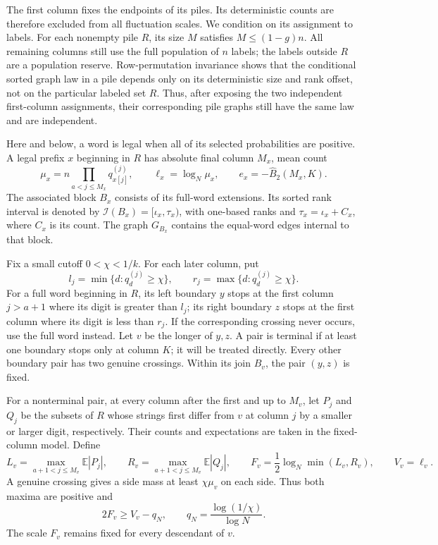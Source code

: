 \documentclass[11pt]{article}
\numberwithin{equation}{section}
\newcommand{\E}{\mathbb E}
\newcommand{\1}{\mathbf 1}
\begin{document}
The first column fixes the endpoints of its piles. Its deterministic
counts are therefore excluded from all fluctuation scales. We condition
on its assignment to labels. For each nonempty pile $R$, its size $M$
satisfies $M\le(1-g)n$. All remaining columns still use the full
population of $n$ labels; the labels outside $R$ are a population reserve.
Row-permutation invariance shows that the conditional sorted graph law
in a pile depends only on its deterministic size and rank offset, not
on the particular labeled set $R$. Thus, after exposing the two
independent first-column assignments, their corresponding pile graphs
still have the same law and are independent.

Here and below, a word is legal when all of its selected probabilities
are positive. A legal prefix $x$ beginning in $R$ has absolute final
column $M_x$, mean count
\[
 \mu_x=n\prod_{a<j\le M_x}q^{(j)}_{x[j]},\qquad
 \ell_x=\log_N\mu_x,\qquad e_x=-\widehat B_2(M_x,K).
\]
The associated block $B_x$ consists of its full-word extensions. Its
sorted rank interval is denoted by $\mathcal I(B_x)=[\iota_x,\tau_x)$,
with one-based ranks and $\tau_x=\iota_x+C_x$, where $C_x$ is its count.
The graph $G_{B_x}$ contains the equal-word edges internal to that block.

Fix a small cutoff $0<\chi<1/k$. For each later column, put
\[
 l_j=\min\{d:q^{(j)}_d\ge\chi\},\qquad
 r_j=\max\{d:q^{(j)}_d\ge\chi\}.
\]
For a full word beginning in $R$, its left boundary $y$ stops at the first
column $j>a+1$ where its digit is greater than $l_j$; its right boundary
$z$ stops at the first column where its digit is less than $r_j$.
If the corresponding crossing never occurs, use the full word instead.
Let $v$ be the longer of $y,z$. A pair is terminal if at least one
boundary stops only at column $K$; it will be treated directly.
Every other boundary pair has two genuine crossings. Within its join
$B_v$, the pair $(y,z)$ is fixed.

For a nonterminal pair, at every column after the first and up to $M_v$,
let $P_j$ and $Q_j$ be the subsets of $R$ whose strings first differ
from $v$ at column $j$ by a smaller or larger digit, respectively.
Their counts and expectations are taken in the fixed-column model.
Define
\begin{equation}
\label{eq:ub-anchored-fluctuation}
 L_v=\max_{a+1<j\le M_v}\E|P_j|,\qquad
 R_v=\max_{a+1<j\le M_v}\E|Q_j|,\qquad
 F_v=\frac12\log_N\min(L_v,R_v),\qquad V_v=\ell_v.
\end{equation}
A genuine crossing gives a side mass at least $\chi\mu_v$ on each
side. Thus both maxima are positive and
\begin{equation}
\label{eq:ub-anchored-fluctuation-comparison}
 2F_v\ge V_v-q_N,\qquad q_N=\frac{\log(1/\chi)}{\log N}.
\end{equation}
The scale $F_v$ remains fixed for every descendant of $v$.
\end{document}

